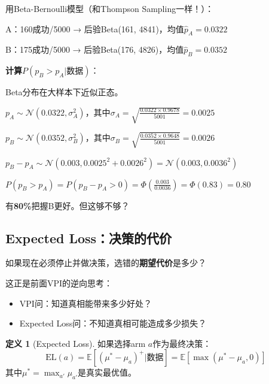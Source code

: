 \documentclass[11pt,a4paper]{article}
\theoremstyle{definition}
\newtheorem{definition}{定义}[section]
\begin{document}
\begin{calculation}[B比A好的概率]
用Beta-Bernoulli模型（和Thompson Sampling一样！）：

A：160成功/5000 → 后验Beta(161, 4841)，均值$\hat{p}_A = 0.0322$

B：175成功/5000 → 后验Beta(176, 4826)，均值$\hat{p}_B = 0.0352$

\textbf{计算$P(p_B > p_A | \text{数据})$}：

Beta分布在大样本下近似正态。

$p_A \sim \mathcal{N}(0.0322, \sigma_A^2)$，其中$\sigma_A = \sqrt{\frac{0.0322 \times 0.9678}{5001}} = 0.0025$

$p_B \sim \mathcal{N}(0.0352, \sigma_B^2)$，其中$\sigma_B = \sqrt{\frac{0.0352 \times 0.9648}{5001}} = 0.0026$

$p_B - p_A \sim \mathcal{N}(0.003, 0.0025^2 + 0.0026^2) = \mathcal{N}(0.003, 0.0036^2)$

$P(p_B > p_A) = P(p_B - p_A > 0) = \Phi\left(\frac{0.003}{0.0036}\right) = \Phi(0.83) = 0.80$

有\textbf{80\%}把握B更好。但这够不够？
\end{calculation}

\subsection{Expected Loss：决策的代价}

\begin{plainwords}
如果现在必须停止并做决策，选错的\textbf{期望代价}是多少？

这正是前面VPI的逆向思考：
\begin{itemize}
    \item VPI问：知道真相能带来多少好处？
    \item Expected Loss问：不知道真相可能造成多少损失？
\end{itemize}
\end{plainwords}

\begin{definition}[Expected Loss]
如果选择arm $a$作为最终决策：
\[
\text{EL}(a) = \mathbb{E}[(\mu^* - \mu_a)^+ | \text{数据}] = \mathbb{E}[\max(\mu^* - \mu_a, 0)]
\]
其中$\mu^* = \max_{a'} \mu_{a'}$是真实最优值。
\end{definition}
\end{document}
